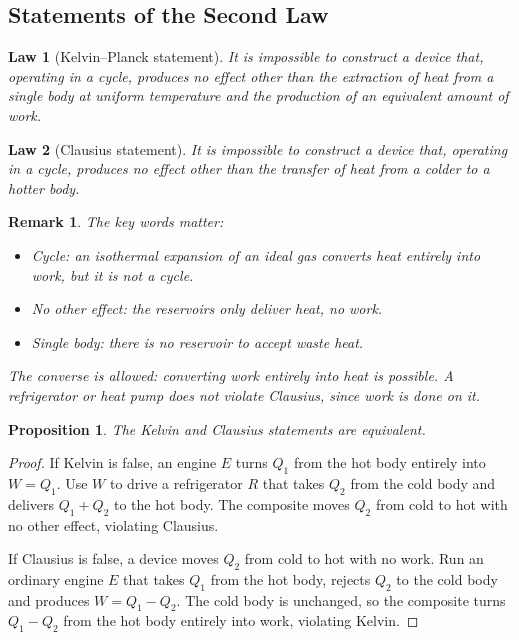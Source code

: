 \documentclass{article}
\newtheorem{law}{Law}
\newtheorem{remark}{Remark}
\newtheorem{proposition}{Proposition}
\begin{document}
\subsection{Statements of the Second Law}
\begin{law}[Kelvin--Planck statement]
    It is impossible to construct a device that, operating in a cycle, produces no effect other than the extraction of heat from a single body at uniform temperature and the production of an equivalent amount of work.
\end{law}

\begin{law}[Clausius statement]
    It is impossible to construct a device that, operating in a cycle, produces no effect other than the transfer of heat from a colder to a hotter body.
\end{law}

\begin{remark}
    The key words matter:
    \begin{itemize}
        \item \textit{Cycle}: an isothermal expansion of an ideal gas converts heat entirely into work, but it is not a cycle.
        \item \textit{No other effect}: the reservoirs only deliver heat, no work.
        \item \textit{Single body}: there is no reservoir to accept waste heat.
    \end{itemize}
    The converse is allowed: converting work entirely into heat is possible. A refrigerator or heat pump does not violate Clausius, since work is done on it.
\end{remark}

\begin{proposition}
    The Kelvin and Clausius statements are equivalent.
\end{proposition}
\begin{proof}
    If Kelvin is false, an engine $E$ turns $Q_1$ from the hot body entirely into $W = Q_1$. Use $W$ to drive a refrigerator $R$ that takes $Q_2$ from the cold body and delivers $Q_1 + Q_2$ to the hot body. The composite moves $Q_2$ from cold to hot with no other effect, violating Clausius.

    If Clausius is false, a device moves $Q_2$ from cold to hot with no work. Run an ordinary engine $E$ that takes $Q_1$ from the hot body, rejects $Q_2$ to the cold body and produces $W = Q_1 - Q_2$. The cold body is unchanged, so the composite turns $Q_1 - Q_2$ from the hot body entirely into work, violating Kelvin.
\end{proof}
\end{document}
